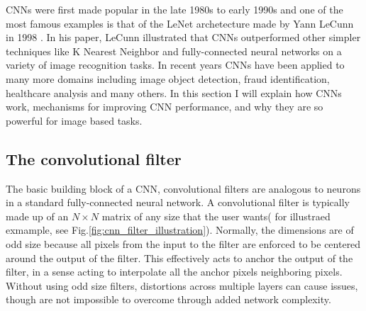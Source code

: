 \ac{CNN}s were first made popular in the late 1980s to early 1990s 
and one of the most famous examples is that of the LeNet archetecture 
made by Yann LeCunn in 1998 \cite{726791}. In his paper, LeCunn 
illustrated that \ac{CNN}s outperformed other simpler 
techniques like K Nearest Neighbor and fully-connected 
neural networks on a variety of image recognition 
tasks. In recent years \ac{CNN}s have been applied to 
many more domains including image object detection, 
fraud identification, healthcare analysis and many 
others. In this section I will explain how \ac{CNN}s work, 
mechanisms for improving \ac{CNN} performance, and 
why they are so powerful for image based tasks.

\subsection{The convolutional filter}

% 
% 
The basic building block of a \ac{CNN}, convolutional 
filters are analogous to neurons in a standard fully-connected 
neural network. A convolutional filter is typically made up of 
an $N \times N$ matrix of any size that the user wants( for illustraed 
exmample, see Fig.\ref{fig:cnn_filter_illustration}). Normally, 
the dimensions are of odd size because all pixels from the input 
to the filter are enforced to be centered around the output 
of the filter. This effectively acts to anchor the output 
of the filter, in a sense acting to interpolate all 
the anchor pixels neighboring pixels. Without using odd size filters, distortions 
across multiple layers can cause issues, though are not impossible 
to overcome through added network complexity.

